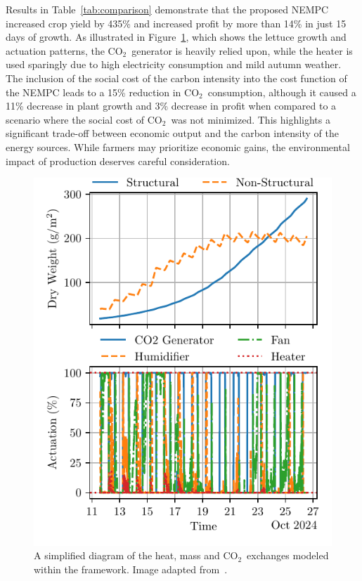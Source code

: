 \documentclass[conference]{IEEEtran}
\newcommand{\coo}{\ensuremath{\mathrm{CO_2}}}
\begin{document}
Results in Table~\ref{tab:comparison} demonstrate that the proposed NEMPC increased crop yield by 435\% and increased profit by more than 14\% in just 15 days of growth. As illustrated in Figure~\ref{fig:control}, which shows the lettuce growth and actuation patterns, the \coo\ generator is heavily relied upon, while the heater is used sparingly due to high electricity consumption and mild autumn weather.
The inclusion of the social cost of the carbon intensity into the cost function of the NEMPC leads to a 15\% reduction in \coo\ consumption, although it caused a 11\% decrease in plant growth and 3\% decrease in profit when compared to a scenario where the social cost of \coo\ was not minimized. This highlights a significant trade-off between economic output and the carbon intensity of the energy sources. While farmers may prioritize economic gains, the environmental impact of production deserves careful consideration.
\begin{figure}\label{fig:control}
    \centering
    \includegraphics[width=\linewidth]{figures/greenhouse_control-mpc_co2-N_30-steps_10801.pdf}
    \caption{A simplified diagram of the heat, mass and \coo\ exchanges modeled within the framework. Image adapted from~\cite{Ward2019}.}
\end{figure}
\end{document}
